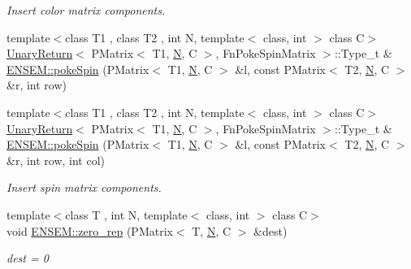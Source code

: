 \begin{DoxyCompactItemize}
\begin{DoxyCompactList}\small\item\em Insert color matrix components. \end{DoxyCompactList}\item 
{\footnotesize template$<$class T1 , class T2 , int N, template$<$ class, int $>$ class C$>$ }\\\mbox{\hyperlink{structUnaryReturn}{Unary\+Return}}$<$ P\+Matrix$<$ T1, \mbox{\hyperlink{adat__devel_2lib_2hadron_2operator__name__util_8cc_a7722c8ecbb62d99aee7ce68b1752f337}{N}}, C $>$, Fn\+Poke\+Spin\+Matrix $>$\+::Type\+\_\+t \& \mbox{\hyperlink{group__primmatrix_ga738f0f1d3bad8770111452c72714a4ae}{E\+N\+S\+E\+M\+::poke\+Spin}} (P\+Matrix$<$ T1, \mbox{\hyperlink{adat__devel_2lib_2hadron_2operator__name__util_8cc_a7722c8ecbb62d99aee7ce68b1752f337}{N}}, C $>$ \&l, const P\+Matrix$<$ T2, \mbox{\hyperlink{adat__devel_2lib_2hadron_2operator__name__util_8cc_a7722c8ecbb62d99aee7ce68b1752f337}{N}}, C $>$ \&r, int row)
\item 
{\footnotesize template$<$class T1 , class T2 , int N, template$<$ class, int $>$ class C$>$ }\\\mbox{\hyperlink{structUnaryReturn}{Unary\+Return}}$<$ P\+Matrix$<$ T1, \mbox{\hyperlink{adat__devel_2lib_2hadron_2operator__name__util_8cc_a7722c8ecbb62d99aee7ce68b1752f337}{N}}, C $>$, Fn\+Poke\+Spin\+Matrix $>$\+::Type\+\_\+t \& \mbox{\hyperlink{group__primmatrix_gaf6f04aa80d2490f962a3132eb16fa98a}{E\+N\+S\+E\+M\+::poke\+Spin}} (P\+Matrix$<$ T1, \mbox{\hyperlink{adat__devel_2lib_2hadron_2operator__name__util_8cc_a7722c8ecbb62d99aee7ce68b1752f337}{N}}, C $>$ \&l, const P\+Matrix$<$ T2, \mbox{\hyperlink{adat__devel_2lib_2hadron_2operator__name__util_8cc_a7722c8ecbb62d99aee7ce68b1752f337}{N}}, C $>$ \&r, int row, int col)
\begin{DoxyCompactList}\small\item\em Insert spin matrix components. \end{DoxyCompactList}\item 
{\footnotesize template$<$class T , int N, template$<$ class, int $>$ class C$>$ }\\void \mbox{\hyperlink{group__primmatrix_gab1edf71028dd684730e061dcc75b5b83}{E\+N\+S\+E\+M\+::zero\+\_\+rep}} (P\+Matrix$<$ T, \mbox{\hyperlink{adat__devel_2lib_2hadron_2operator__name__util_8cc_a7722c8ecbb62d99aee7ce68b1752f337}{N}}, C $>$ \&dest)
\begin{DoxyCompactList}\small\item\em dest = 0 \end{DoxyCompactList}\item 

\end{DoxyCompactItemize}
